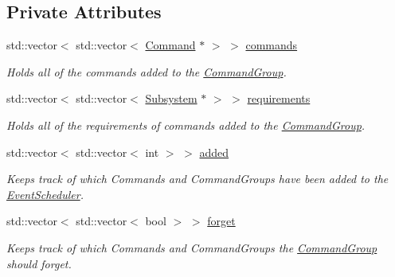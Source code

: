 \subsection*{Private Attributes}
\begin{DoxyCompactItemize}
\item 
std\+::vector$<$ std\+::vector$<$ \mbox{\hyperlink{classlib_iterative_robot_1_1_command}{Command}} $\ast$ $>$ $>$ \mbox{\hyperlink{classlib_iterative_robot_1_1_command_group_aa7a293ed14071e183070e00580ccbecf}{commands}}
\begin{DoxyCompactList}\small\item\em Holds all of the commands added to the \mbox{\hyperlink{classlib_iterative_robot_1_1_command_group}{Command\+Group}}. \end{DoxyCompactList}\item 
std\+::vector$<$ std\+::vector$<$ \mbox{\hyperlink{classlib_iterative_robot_1_1_subsystem}{Subsystem}} $\ast$ $>$ $>$ \mbox{\hyperlink{classlib_iterative_robot_1_1_command_group_ad804d6ab2feaec9e95dde18706548a89}{requirements}}
\begin{DoxyCompactList}\small\item\em Holds all of the requirements of commands added to the \mbox{\hyperlink{classlib_iterative_robot_1_1_command_group}{Command\+Group}}. \end{DoxyCompactList}\item 
\mbox{\label{classlib_iterative_robot_1_1_command_group_a93fe86db750ed4c728626eace7e66a2f}} 
std\+::vector$<$ std\+::vector$<$ int $>$ $>$ \mbox{\hyperlink{classlib_iterative_robot_1_1_command_group_a93fe86db750ed4c728626eace7e66a2f}{added}}
\begin{DoxyCompactList}\small\item\em Keeps track of which Commands and Command\+Groups have been added to the \mbox{\hyperlink{classlib_iterative_robot_1_1_event_scheduler}{Event\+Scheduler}}. \end{DoxyCompactList}\item 
\mbox{\label{classlib_iterative_robot_1_1_command_group_ae6779a068983b84e265c0ff4fc74488d}} 
std\+::vector$<$ std\+::vector$<$ bool $>$ $>$ \mbox{\hyperlink{classlib_iterative_robot_1_1_command_group_ae6779a068983b84e265c0ff4fc74488d}{forget}}
\begin{DoxyCompactList}\small\item\em Keeps track of which Commands and Command\+Groups the \mbox{\hyperlink{classlib_iterative_robot_1_1_command_group}{Command\+Group}} should forget. \end{DoxyCompactList}\item 

\end{DoxyCompactItemize}
